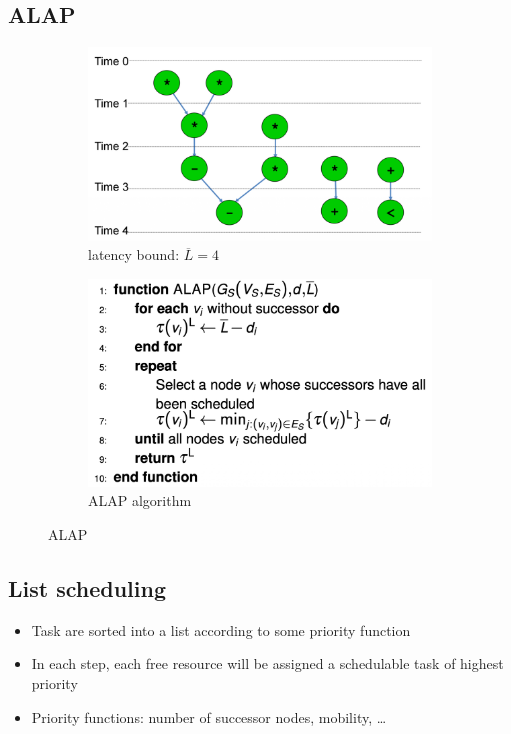 \subsection{ALAP}
\begin{figure}[h]
	\begin{center}
	\begin{subfigure}[b]{0.45\textwidth}
		\includegraphics[width=\textwidth]{images/ALAP_graph.png}
		\caption{latency bound: $\overline L = 4$}
		\label{fig:ALAP_graph}
	\end{subfigure}
	\hfill
	\begin{subfigure}[b]{0.45\textwidth}
		\includegraphics[width=\textwidth]{images/ALAP.png}
		\caption{ALAP algorithm}
		\label{fig:ALAP_algo}
	\end{subfigure}
	\caption{ALAP}
	\end{center}
\end{figure}

\subsection{List scheduling}
\begin{itemize}
	\item Task are sorted into a list according to some priority function
	\item In each step, each free resource will be assigned a schedulable task of highest priority
	\item Priority functions: number of successor nodes, mobility, \dots
\end{itemize}

